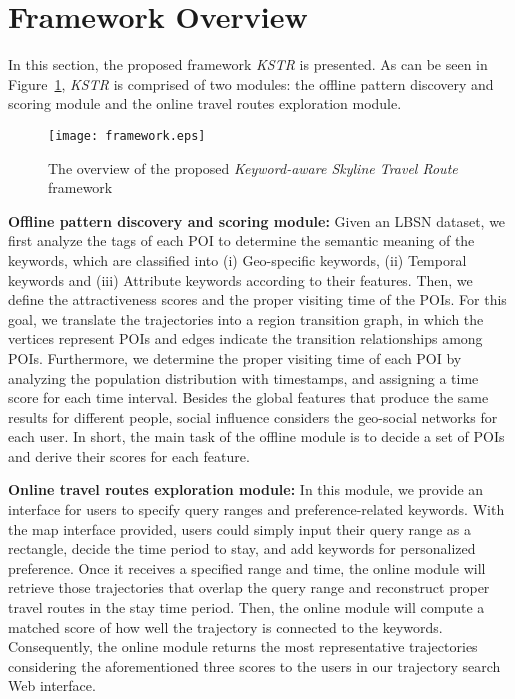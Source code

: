 \section{Framework Overview}
In this section, the proposed framework \textit{KSTR} is presented. As can be seen in Figure~\ref{fig:framework}, \textit{KSTR} is comprised of two modules: the offline pattern discovery and scoring module and the online travel routes exploration module. %
\vspace{-3mm}

\begin{figure}[h]
\centering
\texttt{[image: framework.eps]}
\caption{The overview of the proposed \textit{Keyword-aware Skyline Travel Route} framework}
\label{fig:framework}
\end{figure} 

\textbf{Offline pattern discovery and scoring module:} Given an LBSN dataset, we first analyze the tags of each POI to determine the semantic meaning of the keywords, which are classified into (i) Geo-specific keywords, (ii) Temporal keywords and (iii) Attribute keywords according to their features. Then, we define the attractiveness scores and the proper visiting time of the POIs. For this goal, we translate the trajectories into a region transition graph, in which the vertices represent POIs and edges indicate the transition relationships among POIs. Furthermore, we determine the proper visiting time of each POI by analyzing the population distribution with timestamps, and assigning a time score for each time interval. Besides the global features that produce the same results for different people, social influence considers the geo-social networks for each user. In short, the main task of the offline module is to decide a set of POIs and derive their scores for each feature.

\textbf{Online travel routes exploration module:} In this module, we provide an interface for users to specify query ranges and preference-related keywords. With the map interface provided, users could simply input their query range as a rectangle, decide the time period to stay, and add keywords for personalized preference. Once it receives a specified range and time, the online module will retrieve those trajectories that overlap the query range and reconstruct proper travel routes in the stay time period. Then, the online module will compute a matched score of how well the trajectory is connected to the keywords. Consequently, the online module returns the most representative trajectories considering the aforementioned three scores to the users in our trajectory search Web interface. %